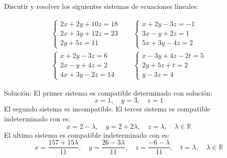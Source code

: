\begin{ejercicio}Discutir y resolver los siguientes sistemas de ecuaciones lineales:

	\begin{align*}
		\begin{cases}
			2x + 2y + 10z = 18 \\
			2x + 3y + 12z = 23 \\
			2y + 5z = 11
		\end{cases} & \quad
		\begin{cases}
			x + 2y - 3z = -1 \\
			3x - y + 2z = 1  \\
			5x + 3y - 4z = 2
		\end{cases}       \\
		\begin{cases}
			x + 2y - 3z = 6 \\
			2x - y + 4z = 2 \\
			4x + 3y - 2z = 14
		\end{cases}    & \quad
		\begin{cases}
			x - 3y + 4z - 2t = 5 \\
			2y + 5z + t = 2      \\
			y - 3z = 4
		\end{cases}
	\end{align*}

	Solución: El primer sistema es compatible determinado con solución:
	\[
		x = 1, \quad y = 3, \quad z = 1
	\]
	El segundo sistema es incompatible. El tercer sistema es compatible indeterminado con es:
	\[
		x = 2 - \lambda, \quad y = 2 + 2\lambda, \quad z = \lambda, \quad \lambda \in \mathbb{R}
	\]
	El ultimo sistema es compatible indeterminado con es:
	\begin{equation*}
		x = \frac{157 + 15\lambda}{11}, \quad y = \frac{26-3\lambda}{11}, \quad z = \frac{-6-\lambda}{11},
		\quad t = \lambda, \quad \lambda \in \mathbb{R}
	\end{equation*}
\end{ejercicio}
